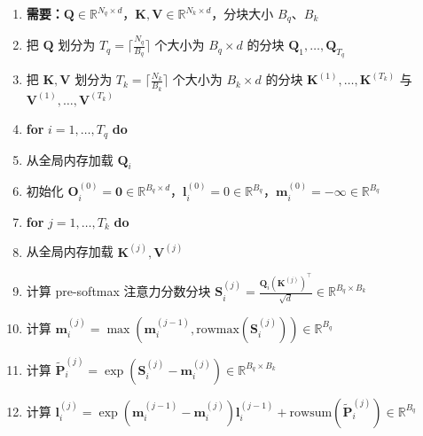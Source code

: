 \begin{enumerate}[label=\arabic*., leftmargin=2.2em, itemsep=1pt, parsep=0pt]
  \item \textbf{需要：}$\boldsymbol{Q} \in \mathbb{R}^{N_q \times d}$，$\boldsymbol{K}, \boldsymbol{V} \in \mathbb{R}^{N_k \times d}$，分块大小 $B_q$、$B_k$
  \item 把 $\boldsymbol{Q}$ 划分为 $T_q = \lceil \frac{N_q}{B_q} \rceil$ 个大小为 $B_q \times d$ 的分块 $\boldsymbol{Q}_1, \dots, \boldsymbol{Q}_{T_q}$
  \item 把 $\boldsymbol{K}, \boldsymbol{V}$ 划分为 $T_k = \lceil \frac{N_k}{B_k} \rceil$ 个大小为 $B_k \times d$ 的分块 $\boldsymbol{K}^{(1)}, \dots, \boldsymbol{K}^{(T_k)}$ 与 $\boldsymbol{V}^{(1)}, \dots, \boldsymbol{V}^{(T_k)}$
  \item \textbf{for} $i = 1, \dots, T_q$ \textbf{do}
  \item \hspace*{1.6em}从全局内存加载 $\boldsymbol{Q}_i$
  \item \hspace*{1.6em}初始化 $\boldsymbol{O}_i^{(0)} = \boldsymbol{0} \in \mathbb{R}^{B_q \times d}$，$\boldsymbol{l}_i^{(0)} = 0 \in \mathbb{R}^{B_q}$，$\boldsymbol{m}_i^{(0)} = -\infty \in \mathbb{R}^{B_q}$
  \item \hspace*{1.6em}\textbf{for} $j = 1, \dots, T_k$ \textbf{do}
  \item \hspace*{3.2em}从全局内存加载 $\boldsymbol{K}^{(j)}, \boldsymbol{V}^{(j)}$
  \item \hspace*{3.2em}计算 pre-softmax 注意力分数分块 $\boldsymbol{S}_i^{(j)} = \frac{\boldsymbol{Q}_i (\boldsymbol{K}^{(j)})^{\top}}{\sqrt{d}} \in \mathbb{R}^{B_q \times B_k}$
  \item \hspace*{3.2em}计算 $\boldsymbol{m}_i^{(j)} = \max\left(\boldsymbol{m}_i^{(j-1)}, \mathrm{rowmax}(\boldsymbol{S}_i^{(j)})\right) \in \mathbb{R}^{B_q}$
  \item \hspace*{3.2em}计算 $\tilde{\boldsymbol{P}}_i^{(j)} = \exp\left(\boldsymbol{S}_i^{(j)} - \boldsymbol{m}_i^{(j)}\right) \in \mathbb{R}^{B_q \times B_k}$
  \item \hspace*{3.2em}计算 $\boldsymbol{l}_i^{(j)} = \exp\left(\boldsymbol{m}_i^{(j-1)} - \boldsymbol{m}_i^{(j)}\right) \boldsymbol{l}_i^{(j-1)} + \mathrm{rowsum}\left(\tilde{\boldsymbol{P}}_i^{(j)}\right) \in \mathbb{R}^{B_q}$

\end{enumerate}
